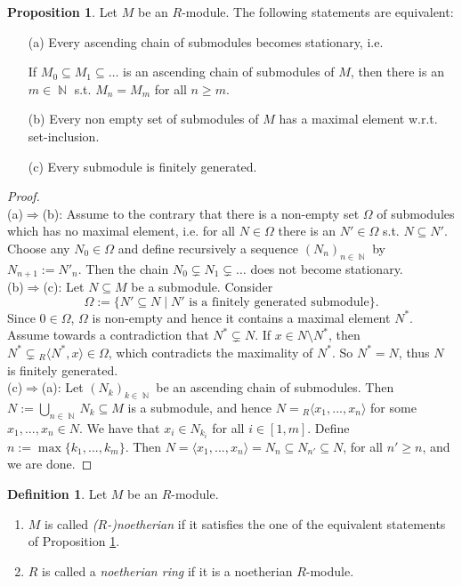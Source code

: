 \documentclass[12pt,a4paper]{report}
\theoremstyle{definition}
\newtheorem{proposition}[theorem]{Proposition}
\newtheorem{defn}[theorem]{Definition}
\theoremstyle{num.custom-title}
\DeclareMathOperator{\N}{\mathbb{N}}
\DeclareMathOperator{\imp}{\Rightarrow}
\DeclareMathOperator{\sm}{\setminus}
\DeclareMathOperator{\sse}{\subseteq}
\begin{document}
\begin{proposition}\label{char-noeth-mod}
Let $M$ be an $R$-module. The following statements are equivalent:
\begin{enumerate}
\item[(a)] Every ascending chain of submodules becomes stationary, i.e.
\begin{center}
If $M_0 \sse M_1 \sse \ldots$ is an ascending chain of submodules of $M$, then there is an $m \in \N$ s.t. $M_n = M_m$ for all $n \geq m$.
\end{center}
\item[(b)] Every non empty set of submodules of $M$ has a maximal element w.r.t. set-inclusion.
\item[(c)] Every submodule is finitely generated.
\end{enumerate}
\begin{proof}\ \\
(a)$\imp$(b): Assume to the contrary that there is a non-empty set $\Omega$ of submodules which has no maximal element, i.e. for all $N \in \Omega$ there is an $N' \in \Omega$ s.t. $N \sse N'$. Choose any $N_0 \in \Omega$ and define recursively a sequence $(N_n)_{n \in \N}$ by $N_{n+1} := N'_n$. Then the chain $N_0 \subsetneq N_1 \subsetneq \ldots$ does not become stationary.
\\[6pt]
(b)$\imp$(c): Let $N \sse M$ be a submodule. Consider
\[
\Omega := \{N' \sse N \mid N' \text{ is a finitely generated submodule}\}.
\]
Since $0 \in \Omega$, $\Omega$ is non-empty and hence it contains a maximal element $N^*$. Assume towards a contradiction that $N^* \subsetneq N$. If $x \in N \sm N^*$, then $N^* \subsetneq {}_R \langle N^*,x \rangle \in \Omega$, which contradicts the maximality of $N^*$. So $N^*=N$, thus $N$ is finitely generated.
\\[6pt]
(c)$\imp$(a): Let $(N_k)_{k \in \N}$ be an ascending chain of submodules. Then $N:= \bigcup_{n \in \N} N_k \sse M$ is a submodule, and hence $N = {}_R \langle x_1,...,x_n \rangle$ for some $x_1,...,x_n \in N$. We have that $x_i \in N_{k_i}$ for all $i \in [1,m]$. Define $n:= \max\{k_1,...,k_m\}$. Then $N = \langle x_1,...,x_n \rangle = N_n \sse N_{n'} \sse N$, for all $n' \geq n$, and we are done.
\end{proof}
\end{proposition}

\begin{defn}
Let $M$ be an $R$-module.
\begin{enumerate}
\item $M$ is called \emph{($R$-)noetherian} if it satisfies the one of the equivalent statements of Proposition \ref{char-noeth-mod}.
\item $R$ is called a \emph{noetherian ring} if it is a noetherian $R$-module.
\end{enumerate}
\end{defn}
\end{document}
